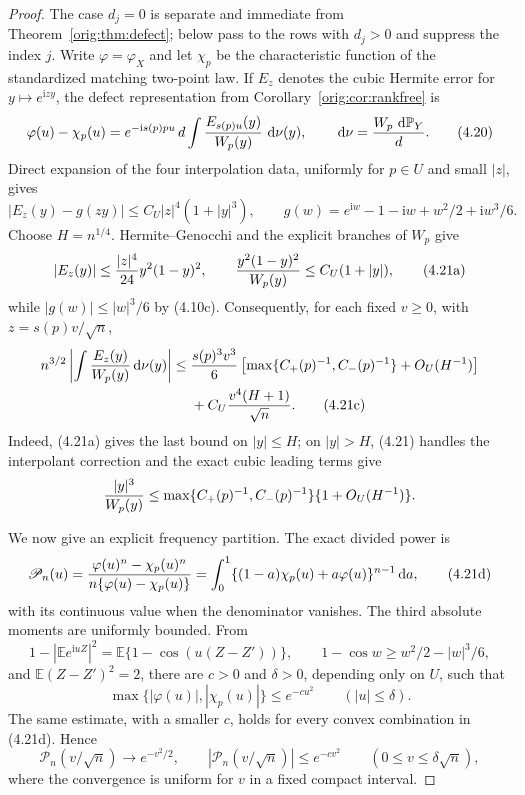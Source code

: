 \documentclass[11pt,a4paper]{article}
\numberwithin{equation}{section}
\theoremstyle{definition}
\theoremstyle{remark}
\newcommand{\E}{\mathbb E}
\newcommand{\Pp}{\mathbb P}
\newcommand{\ii}{\mathrm i}
\newcommand{\dd}{\,\mathrm d}
\begin{document}
\begin{proof}
The case $d_j=0$ is separate and immediate from
Theorem~\ref{orig:thm:defect}; below pass to the rows with $d_j>0$ and suppress
the index $j$.  Write $\varphi=\varphi_X$ and let $\chi_p$ be the
characteristic function of the standardized matching two-point law.  If
$E_z$ denotes the cubic Hermite error for $y\mapsto e^{\ii zy}$, the
 defect representation from Corollary~\ref{orig:cor:rankfree} is
\[
 \varphi(u)-\chi_p(u)=e^{-\ii s(p)pu}\,d
       \int {E_{s(p)u}(y)\over W_p(y)}\,\dd\nu(y),\qquad
 \dd\nu={W_p\,\dd\Pp_Y\over d}.                       \tag{4.20}
\]
Direct expansion of the four interpolation data, uniformly for $p\in U$
and small $|z|$, gives
\[
 |E_z(y)-g(zy)|\le C_U|z|^4(1+|y|^3),\qquad
 g(w)=e^{\ii w}-1-\ii w+w^2/2+\ii w^3/6.              \tag{4.21}
\]
Choose $H=n^{1/4}$.  Hermite--Genocchi and the explicit branches of
$W_p$ give
\[
 |E_z(y)|\le {|z|^4\over24}y^2(1-y)^2,\qquad
 {y^2(1-y)^2\over W_p(y)}\le C_U(1+|y|),              \tag{4.21a}
\]
while $|g(w)|\le |w|^3/6$ by (4.10c).  Consequently, for each fixed
$v\ge0$, with $z=s(p)v/\sqrt n$,
\begin{align}
 n^{3/2}\left|\int {E_z(y)\over W_p(y)}\dd\nu(y)\right|
 \le{}&{s(p)^3v^3\over6}
   \left[\max\{C_+(p)^{-1},C_-(p)^{-1}\}+O_U(H^{-1})\right]
 \notag\\
 &+C_U{v^4(H+1)\over\sqrt n}.                         \tag{4.21c}
\end{align}
Indeed, (4.21a) gives the last bound on $|y|\le H$; on $|y|>H$,
(4.21) handles the interpolant correction and the exact cubic leading
terms give
\[
 { |y|^3\over W_p(y)}\le
 \max\{C_+(p)^{-1},C_-(p)^{-1}\}\{1+O_U(H^{-1})\}.
\]

We now give an explicit frequency partition.  The exact divided power is
\[
 \mathscr P_n(u)={\varphi(u)^n-\chi_p(u)^n\over
             n\{\varphi(u)-\chi_p(u)\}}
 =\int_0^1\{(1-a)\chi_p(u)+a\varphi(u)\}^{n-1}\dd a,             \tag{4.21d}
\]
with its continuous value when the denominator vanishes.  The third
absolute moments are uniformly bounded.  From
\[
 1-|\E e^{\ii uZ}|^2=\E\{1-\cos(u(Z-Z'))\},\qquad
 1-\cos w\ge w^2/2-|w|^3/6,
\]
and $\E(Z-Z')^2=2$, there are $c>0$ and $\delta>0$, depending only on
$U$, such that
\[
 \max\{|\varphi(u)|,|\chi_p(u)|\}\le e^{-cu^2}\qquad(|u|\le\delta).
                                                               \tag{4.21e}
\]
The same estimate, with a smaller $c$, holds for every convex combination
in (4.21d).  Hence
\[
 \mathscr P_n(v/\sqrt n)\longrightarrow e^{-v^2/2},\qquad
 |\mathscr P_n(v/\sqrt n)|\le e^{-cv^2}\qquad(0\le v\le\delta\sqrt n), \tag{4.21f}
\]
where the convergence is uniform for $v$ in a fixed compact interval.


\end{proof}
\end{document}
